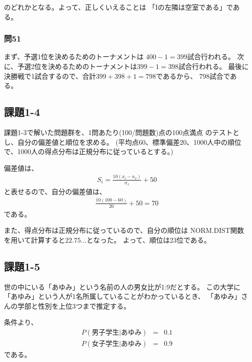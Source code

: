 \documentclass[12pt]{jarticle}
\begin{document}
のどれかとなる。よって、正しくいえることは
「Iの左隣は空室である」である。

\subsubsection*{問51}
まず、予選1位を決めるためのトーナメントは
$400-1=399$試合行われる。
次に、予選2位を決めるためのトーナメントは$399-1=398$試合行われる。
最後に決勝戦で1試合するので、合計$399+398+1=798$であるから、
798試合である。

\subsection{課題1-4}
\begin{shadebox}
    課題1-3で解いた問題群を、1問あたり(100/問題数)点の100点満点
    のテストとし、自分の偏差値と順位を求める。
    (平均点60、標準偏差20、1000人中の順位で、1000人の得点分布は正規分布に従っているとする。)
\end{shadebox}

偏差値は、
\begin{eqnarray}
    S_i=\frac{10(x_i-u_x)}{\sigma_x}+50　\nonumber
\end{eqnarray}
と表せるので、自分の偏差値は、
\begin{eqnarray}
    \frac{10(100-60)}{20}+50=70　\nonumber
\end{eqnarray}
である。

また、得点分布は正規分布に従っているので、自分の順位は
NORM.DIST関数を用いて計算すると$22.75...$となった。
よって、順位は23位である。

\clearpage
\subsection{課題1-5}
\begin{shadebox}
    世の中にいる「あゆみ」という名前の人の男女比が1:9だとする。
    この大学に「あゆみ」という人が1名所属していることがわかっているとき、
    「あゆみ」さんの学部と性別を上位3つまで推定する。
\end{shadebox}

条件より、
\begin{eqnarray}
    P(男子学生|あゆみ)&=&0.1　\nonumber \\
    P(女子学生|あゆみ)&=&0.9　\nonumber
\end{eqnarray}
である。
\end{document}
